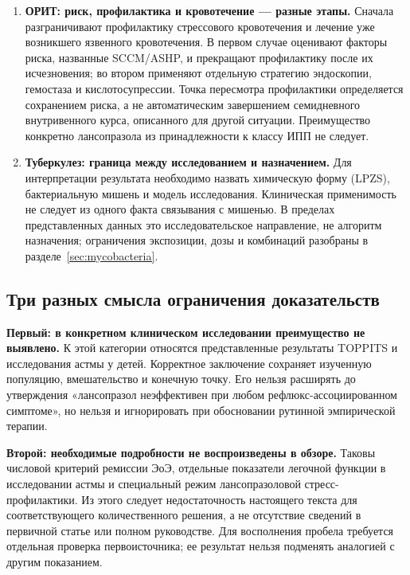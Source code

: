 \documentclass[11pt,a4paper,notitlepage]{report}
\newcommand{\src}[1]{\unskip\space\cite{#1}}
\begin{document}
\begin{enumerate}
\item \textbf{ОРИТ: риск, профилактика и кровотечение --- разные этапы.} Сначала разграничивают профилактику стрессового кровотечения и лечение уже возникшего язвенного кровотечения. В первом случае оценивают факторы риска, названные SCCM/ASHP, и прекращают профилактику после их исчезновения; во втором применяют отдельную стратегию эндоскопии, гемостаза и кислотосупрессии. Точка пересмотра профилактики определяется сохранением риска, а не автоматическим завершением семидневного внутривенного курса, описанного для другой ситуации. Преимущество конкретно лансопразола из принадлежности к классу ИПП не следует.\src{sccm,esge2026,rfpud}

\item \textbf{Туберкулез: граница между исследованием и назначением.} Для интерпретации результата необходимо назвать химическую форму (LPZS), бактериальную мишень и модель исследования. Клиническая применимость не следует из одного факта связывания с мишенью. В пределах представленных данных это исследовательское направление, не алгоритм назначения; ограничения экспозиции, дозы и комбинаций разобраны в разделе~\ref{sec:mycobacteria}.\src{moltb,moltbstructure}
\end{enumerate}

\subsection{Три разных смысла ограничения доказательств}
\textbf{Первый: в конкретном клиническом исследовании преимущество не выявлено.} К этой категории относятся представленные результаты TOPPITS и исследования астмы у детей. Корректное заключение сохраняет изученную популяцию, вмешательство и конечную точку. Его нельзя расширять до утверждения «лансопразол неэффективен при любом рефлюкс-ассоциированном симптоме», но нельзя и игнорировать при обосновании рутинной эмпирической терапии.\src{toppits,asthma}

\textbf{Второй: необходимые подробности не воспроизведены в обзоре.} Таковы числовой критерий ремиссии ЭоЭ, отдельные показатели легочной функции в исследовании астмы и специальный режим лансопразоловой стресс-профилактики. Из этого следует недостаточность настоящего текста для соответствующего количественного решения, а не отсутствие сведений в первичной статье или полном руководстве. Для восполнения пробела требуется отдельная проверка первоисточника; ее результат нельзя подменять аналогией с другим показанием.\src{eoe,eoeguide,asthma,sccm}
\end{document}
